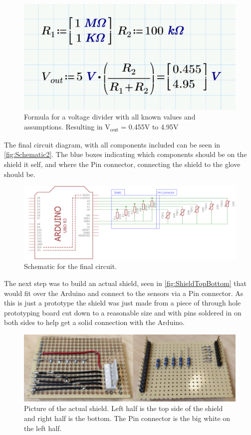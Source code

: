 \begin{figure}[H]
\centering
\includegraphics[scale=0.15]{Figure/FinalFormula.png}
\caption{Formula for a voltage divider with all known values and assumptions. Resulting in V\textsubscript{out} = 0.455V to 4.95V}
\label{fig:FinalFormula}
\end{figure}

The final circuit diagram, with all components included can be seen in \autoref{fig:Schematic2}. The blue boxes indicating which components should be on the shield it self, and where the Pin connector, connecting the shield to the glove should be.
\begin{figure}[H]
\centering
\includegraphics[scale=0.5]{Figure/Schematic2.png}
\caption{Schematic for the final circuit.}
\label{fig:Schematic2}
\end{figure}

The next step was to build an actual shield, seen in \autoref{fig:ShieldTopBottom} that would fit over the Arduino and connect to the sensors via a Pin connector. As this is just a prototype the shield was just made from a piece of through hole prototyping board cut down to a reasonable size and with pins soldered in on both sides to help get a solid connection with the Arduino.

\begin{figure}[H]
\centering
\includegraphics[scale=0.12]{Figure/ShieldTopBottom.png}
\caption{Picture of the actual shield. Left half is the top side of the shield and right half is the bottom. The Pin connector is the big white on the left half.}
\label{fig:ShieldTopBottom}
\end{figure}

